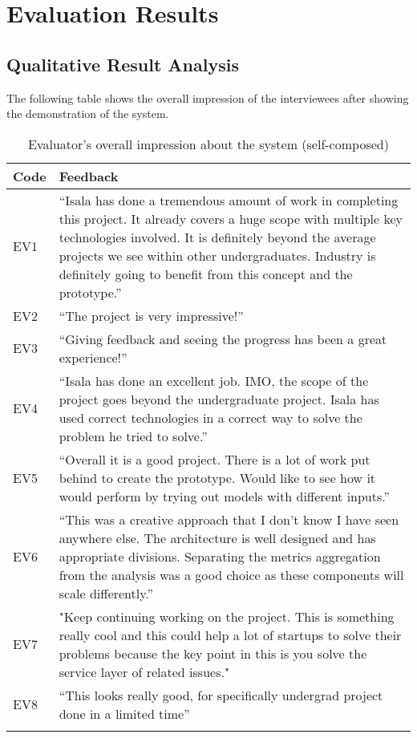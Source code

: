 \newpage
\section{Evaluation Results}

\subsection{Qualitative Result Analysis}

The following table shows the overall impression of the interviewees after showing the demonstration of the system.


\begin{longtable}{|p{8mm}|p{147mm}|}
    \hline
    \textbf{Code} & \textbf{Feedback} \\ \hline
    EV1 & “Isala has done a tremendous amount of work in completing this project. It already covers a huge scope with multiple key technologies involved. It is definitely beyond the average projects we see within other undergraduates. Industry is definitely going to benefit from this concept and the prototype.” \\ \hline
    EV2 & “The project is very impressive!” \\ \hline
    EV3 & “Giving feedback and seeing the progress has been a great experience!” \\ \hline
    EV4 & “Isala has done an excellent job. IMO, the scope of the project goes beyond the undergraduate project. Isala has used correct technologies in a correct way to solve the problem he tried to solve.” \\ \hline
    EV5 & “Overall it is a good project. There is a lot of work put behind to create the prototype. Would like to see how it would perform by trying out models with different inputs.” \\ \hline
    EV6 & “This was a creative approach that I don’t know I have seen anywhere else. The architecture is well designed and has appropriate divisions. Separating the metrics aggregation from the analysis was a good choice as these components will scale differently.” \\ \hline
    EV7 & "Keep continuing working on the project. This is something really cool and this could help a lot of startups to solve their problems because the key point in this is you solve the service layer of related issues." \\ \hline
    EV8 & “This looks really good, for specifically undergrad project done in a limited time” \\ \hline
    \caption{Evaluator's overall impression about the system (self-composed)}
\end{longtable}

